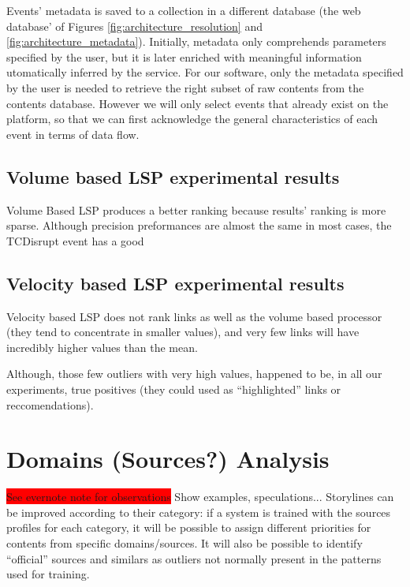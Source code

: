 \documentclass{sig-alternate}
\newcommand{\todo}[1]{\colorbox{red}{#1}}
\begin{document}
Events' metadata is saved to a collection in a different database (the web database' of Figures \ref{fig:architecture_resolution} and \ref{fig:architecture_metadata}). Initially, metadata only comprehends parameters specified by the user, but it is later enriched with meaningful information utomatically inferred by the service. For our software, only the metadata specified by the user is needed to retrieve the right subset of raw contents from the contents database. However we will only select events that already exist on the platform, so that we can first acknowledge the general characteristics of each event in terms of data flow.

\subsection{Volume based LSP experimental results}
\label{sec:volumeResults}

Volume Based LSP produces a better ranking because results' ranking is more sparse. %
Although precision preformances are almost the same in most cases, the TCDisrupt event has a good

\subsection{Velocity based LSP experimental results}
\label{sec:velocityResults}

Velocity based LSP does not rank links as well as the volume based processor (they tend to concentrate in smaller values), and very few links will have incredibly higher values than the mean.

Although, those few outliers with very high values, happened to be, in all our experiments, true positives (they could used as ``highlighted'' links or reccomendations).


\section{Domains (Sources?) Analysis}
\label{sec:sources}
\todo{See evernote note for observations}
Show examples, speculations...
Storylines can be improved according to their category: if a system is trained with the sources profiles for each category, it will be possible to assign different priorities for contents from specific domains/sources. It will also be possible to identify ``official'' sources and similars as outliers not normally present in the patterns used for training.
\end{document}
